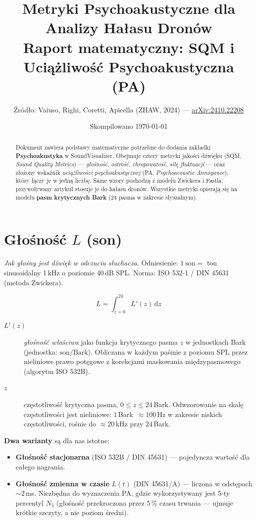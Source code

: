 \documentclass[11pt,a4paper]{article}
\title{\textbf{Metryki Psychoakustyczne dla Analizy Hałasu Dronów}\\
       \large Raport matematyczny: SQM i Uciążliwość Psychoakustyczna (PA)}
\author{Źródło: Vaiuso, Righi, Coretti, Apicella (ZHAW, 2024) ---
        \href{https://arxiv.org/abs/2410.22208}{arXiv:2410.22208}}
\date{Skompilowano \today}
\begin{document}
\maketitle

\begin{abstract}
\noindent
Dokument zawiera podstawy matematyczne potrzebne do dodania zakładki
\textbf{Psychoakustyka} w SoundVisualizer. Obejmuje cztery metryki jakości
dźwięku (SQM, \emph{Sound Quality Metrics}) --- \emph{głośność}, \emph{ostrość},
\emph{chropowatość}, \emph{siłę fluktuacji} --- oraz złożony wskaźnik
\emph{uciążliwości psychoakustycznej} (PA, \emph{Psychoacoustic Annoyance}),
który łączy je w jedną liczbę. Same wzory pochodzą z modelu Zwickera i Fastla;
przywoływany artykuł stosuje je do hałasu dronów. Wszystkie metryki opierają
się na modelu \textbf{pasm krytycznych Bark} (24 pasma w zakresie słyszalnym).
\end{abstract}

\section{Głośność \texorpdfstring{$L$}{L} (son)}

\textit{Jak głośny jest dźwięk w odczuciu słuchacza.} Odniesienie:
$1\ \text{son} = $ ton sinusoidalny 1\,kHz o poziomie 40\,dB SPL. Norma:
ISO 532-1 / DIN 45631 (metoda Zwickera).

\[
  L = \int_{z=0}^{24} L'(z)\, \mathrm{d}z
\]

\begin{description}
  \item[$L'(z)$] \emph{głośność właściwa} jako funkcja krytycznego pasma $z$ w
                jednostkach Bark (jednostka: $\text{son}/\text{Bark}$).
                Obliczana w każdym paśmie z poziomu SPL przez nieliniowe
                prawo potęgowe z korekcjami maskowania międzypasmowego
                (algorytm ISO 532B).
  \item[$z$]    częstotliwość krytyczna pasma, $0 \le z \le 24$\,Bark.
                Odwzorowanie na skalę częstotliwości jest nieliniowe:
                $1$\,Bark~$\approx 100$\,Hz w zakresie niskich częstotliwości,
                rośnie do $\approx 20$\,kHz przy $24$\,Bark.
\end{description}

\noindent\textbf{Dwa warianty} są dla nas istotne:
\begin{itemize}
  \item \textbf{Głośność stacjonarna} (ISO 532B / DIN 45631) --- pojedyncza
        wartość dla całego nagrania.
  \item \textbf{Głośność zmienna w czasie} $L(t)$ (DIN 45631/A) --- liczona
        w odstępach $\sim 2$\,ms. Niezbędna do wyznaczenia PA, gdzie
        wykorzystywany jest 5-ty percentyl $N_5$ (głośność przekroczona przez
        5\,\% czasu trwania --- ujmuje krótkie szczyty, a nie poziom średni).
\end{itemize}
\end{document}
